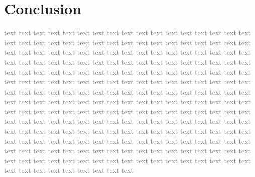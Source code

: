 \documentclass[sigconf]{acmart}
\begin{document}
\section{Conclusion}\label{Conclusion}

\textcolor{gray}{
    text text text text text text text text text text text text text text text text text text text text text text text text text text text text text text text text text text text text text text text text text text text text text text text text text text text text text text text text text text text text text text text text text text text text text text text text text text text text text text text text text text text text text text text text text text text text text text text text text text text text text text text text text text text text text text text text text text text text text text text text text text text text text text text text text text text text text text text text text text text text text text text text text text text text text text text text text text text text text text text text text text text text text text text text text text text text text text text text text text text text text text
    text text text text text text text text text text text text text text text text text text text text text text text text text text text text text text text text text text text text text text text text text text text text text text text text text text text text text text text text text text text text text text text text text
}


\begin{acks}

\end{acks}





\end{document}
